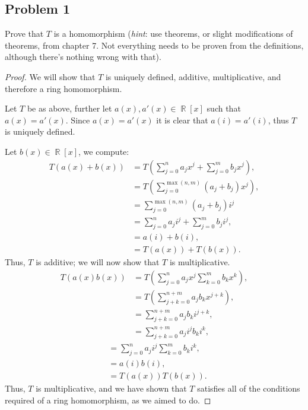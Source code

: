 \documentclass[letterpaper, 12pt]{amsart}
\DeclareMathOperator{\R}{\mathbb{R}}
\begin{document}
		\subsection*{Problem 1}
		\label{sub:problem_1}
		Prove that $T$ is a homomorphism (\textit{hint}: use theorems, or slight modifications of theorems, from chapter 7. 
		Not everything needs to be proven from the definitions, although there's nothing wrong with that).
			\begin{proof}
			We will show that $T$ is uniquely defined, additive, multiplicative, and therefore a ring homomorphism.
			
			Let $T$ be as above, further let $a(x), a'(x) \in \R[x]$ such that $a(x) = a'(x)$.
			Since $a(x) = a'(x)$ it is clear that $a(i) = a'(i)$, thus $T$ is uniquely defined.

			Let $b(x) \in \R[x]$, we compute:
			\begin{align*}
			T(a(x) + b(x)) &= T\left( \sum\limits_{j=0}^{n} a_{j}x^{j} + \sum\limits_{j=0}^{m} b_{j}x^{j} \right), \\
			&= T\left( \sum\limits_{j=0}^{\max{(n,m)}} (a_{j} + b_{j})x^{j} \right), \\
			&= \sum\limits_{j=0}^{\max{(n,m)}} (a_{j} + b_{j})i^{j} \\
			&= \sum\limits_{j=0}^{n} a_{j}i^{j} + \sum\limits_{j=0}^{m} b_{j}i^{j}, \\
			&= a(i) + b(i), \\
			&= T(a(x)) + T(b(x)).
			\end{align*}
			Thus, $T$ is additive; we will now show that $T$ is multiplicative.
			\begin{align*}
			T(a(x)b(x)) &= T\left( \sum\limits_{j=0}^{n} a_{j}x^{j}\sum\limits_{k=0}^{m} b_{k}x^{k} \right), \\
			&= T\left( \sum\limits_{j+k = 0}^{n+m} a_{j}b_{k}x^{j+k} \right), \\
			&= \sum\limits_{j+k = 0}^{n+m} a_{j}b_{k}i^{j+k}, \\
			&= \sum\limits_{j+k = 0}^{n+m} a_{j}i^{j}b_{k}i^{k},
			\end{align*}
			\begin{align*}
			&= \sum\limits_{j=0}^{n} a_{j}i^{j}\sum\limits_{k=0}^{m} b_{k}i^{k}, \\
			&= a(i)b(i), \\
			&= T(a(x))T(b(x)).
			\end{align*}
			Thus, $T$ is multiplicative, and we have shown that $T$ satisfies all of the conditions required of a ring homomorphism, as we aimed to do.
			\end{proof}
\end{document}

